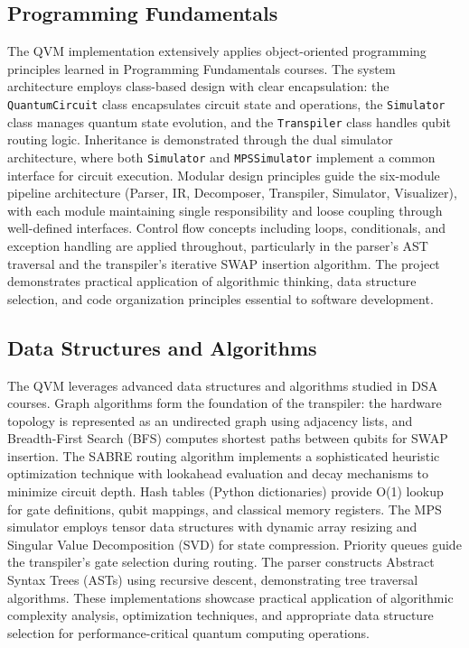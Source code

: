 \vspace{0.5cm}

\subsection{Programming Fundamentals}

The QVM implementation extensively applies object-oriented programming principles learned in Programming Fundamentals courses. The system architecture employs class-based design with clear encapsulation: the \texttt{QuantumCircuit} class encapsulates circuit state and operations, the \texttt{Simulator} class manages quantum state evolution, and the \texttt{Transpiler} class handles qubit routing logic. Inheritance is demonstrated through the dual simulator architecture, where both \texttt{Simulator} and \texttt{MPSSimulator} implement a common interface for circuit execution. Modular design principles guide the six-module pipeline architecture (Parser, IR, Decomposer, Transpiler, Simulator, Visualizer), with each module maintaining single responsibility and loose coupling through well-defined interfaces. Control flow concepts including loops, conditionals, and exception handling are applied throughout, particularly in the parser's AST traversal and the transpiler's iterative SWAP insertion algorithm. The project demonstrates practical application of algorithmic thinking, data structure selection, and code organization principles essential to software development.


\subsection{Data Structures and Algorithms}

The QVM leverages advanced data structures and algorithms studied in DSA courses. Graph algorithms form the foundation of the transpiler: the hardware topology is represented as an undirected graph using adjacency lists, and Breadth-First Search (BFS) computes shortest paths between qubits for SWAP insertion. The SABRE routing algorithm implements a sophisticated heuristic optimization technique with lookahead evaluation and decay mechanisms to minimize circuit depth. Hash tables (Python dictionaries) provide O(1) lookup for gate definitions, qubit mappings, and classical memory registers. The MPS simulator employs tensor data structures with dynamic array resizing and Singular Value Decomposition (SVD) for state compression. Priority queues guide the transpiler's gate selection during routing. The parser constructs Abstract Syntax Trees (ASTs) using recursive descent, demonstrating tree traversal algorithms. These implementations showcase practical application of algorithmic complexity analysis, optimization techniques, and appropriate data structure selection for performance-critical quantum computing operations.



